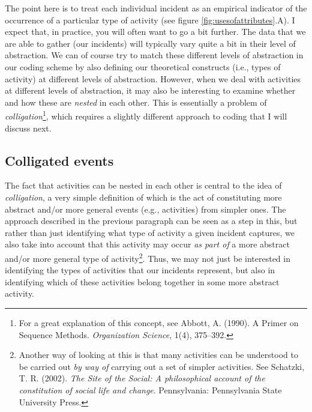 \documentclass{memoir}
\begin{document}
The point here is to treat each individual incident as an empirical indicator of the occurrence of a particular type of activity (see figure \ref{fig:usesofattributes}.A). I expect that, in practice, you will often want to go a bit further. The data that we are able to gather (our incidents) will typically vary quite a bit in their level of abstraction. We can of course try to match these different levels of abstraction in our coding scheme by also defining our theoretical constructs (i.e., types of activity) at different levels of abstraction. However, when we deal with activities at different levels of abstraction, it may also be interesting to examine whether and how these are \emph{nested} in each other. This is essentially a problem of \emph{colligation}\footnote{For a great explanation of this concept, see Abbott, A. (1990). A Primer on Sequence Methods. \emph{Organization Science}, 1(4), 375–392.}, which requires a slightly different approach to coding that I will discuss next.

\subsection{Colligated events}
\label{sec:colligatedevents}

The fact that activities can be nested in each other is central to the idea of \emph{colligation}, a very simple definition of which is the act of constituting more abstract and/or more general events (e.g., activities) from simpler ones. The approach described in the previous paragraph can be seen as a step in this, but rather than just identifying what type of activity a given incident captures, we also take into account that this activity may occur \emph{as part of} a more abstract and/or more general type of activity\footnote{Another way of looking at this is that many activities can be understood to be carried out \emph{by way of} carrying out a set of simpler activities. See Schatzki, T. R. (2002). \emph{The Site of the Social: A philosophical account of the constitution of social life and change}. Pennsylvania: Pennsylvania State University Press.}. Thus, we may not just be interested in identifying the types of activities that our incidents represent, but also in identifying which of these activities belong together in some more abstract activity.   
\end{document}
